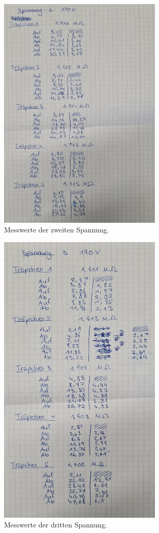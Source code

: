 \begin{figure}
    \centering
    \includegraphics[width=0.7\textwidth]{bilder/Spannung2.jpg}
    \caption{Messwerte der zweiten Spannung.}
\end{figure}

\begin{figure}
    \centering
    \includegraphics[width=0.7\textwidth]{bilder/Spannung3.jpg}
    \caption{Messwerte der dritten Spannung.}
\end{figure}

